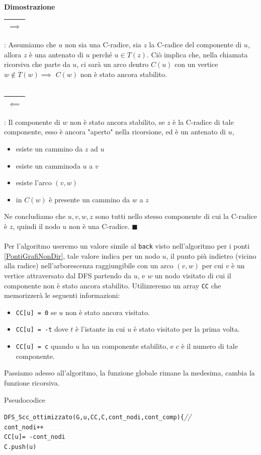 \documentclass[12pt, letterpaper]{article}
\newcommand{\code}[1]{\colorbox{light-gray}{\texttt{#1}}}
\newcommand{\codee}[1]{\colorbox{white}{\texttt{#1}}}
\newcommand{\acc}{\\\hphantom{}\\}
\newcommand{\comm}[1]{\color{lg}\textit{\hphantom{spaz}// \text{#1}}\color{black}}
\newcommand{\boxedMath}[1]{\begin{tabular}{|c|}\hline \texttt{#1} \\ \hline\end{tabular} :}
\begin{document}
  \textbf{Dimostrazione} \boxedMath{$\implies$} Assumiamo che $u$ non sia una C-radice, sia $z$ la C-radice del componente 
  di $u$, allora $z$ è una antenato di $u$ perché $u\in T(z)$. Ciò implica che, nella chiamata ricorsiva che parte da $u$, 
  ci sarà un arco dentro $C(u)$ con un vertice $w\notin T(w)\implies$ $ C(w)$ non è stato ancora stabilito.
\acc\boxedMath{$\impliedby$} Il componente di $w$ non è stato ancora stabilito, se $z$ è la C-radice di tale componente, esso 
è ancora "aperto" nella ricorsione, ed è un antenato di $u$, \begin{itemize}
\item esiste un cammino da $z$ ad $u$
\item esiste un camminoda $u$ a $v$
\item esiste l'arco $(v,w)$
\item in $C(w)$ è presente un cammino da $w$ a $z$
\end{itemize}
Ne concludiamo che $u,v,w,z$ sono tutti nello stesso componente di cui la C-radice è $z$, quindi il nodo $u$
non è una C-radice. $\blacksquare$\acc 
Per l'algoritmo useremo un valore simile al \code{back} visto nell'algoritmo per i ponti \ref{PontiGrafiNonDir}, tale 
valore indica per un nodo $u$, il punto più indietro (vicino alla radice) nell'arborescenza raggiungibile con un 
arco $(v,w)$ per cui $v$ è un vertice attraversato dal DFS partendo da $u$, e $w$ un nodo visitato di cui 
il componente non è stato ancora stabilito. Utilizzeremo un array \code{CC} che memorizzerà le seguenti informazioni:\begin{itemize}
    \item \code{CC[u] = 0} se $u$ non è stato ancora visitato.
    \item \code{CC[u] = -t} dove $t$ è l'istante in cui $u$ è stato visitato per la prima volta. 
    \item \code{CC[u] = c} quando $u$ ha un componente stabilito, e $c$ è il numero di tale componente.
\end{itemize}
Passiamo adesso all'algoritmo, la funzione globale rimane la medesima, cambia la funzione ricorsiva.
\begin{center}
    Pseudocodice
\end{center}
\codee{DFS\_Scc\_ottimizzato(G,u,CC,C,cont\_nodi,cont\_comp)\{}\comm{funzione ricorsiva}\\
\hphantom{ident}\codee{cont\_nodi++}\\
\hphantom{ident}\codee{CC[u]= -cont\_nodi}\\
\hphantom{ident}\codee{C.push(u)}\\
\end{document}
